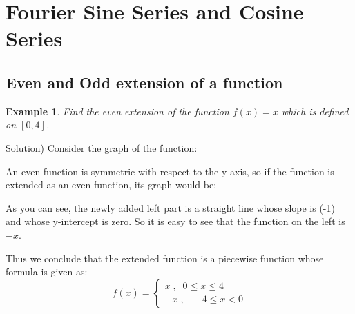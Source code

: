 \documentclass[12pt]{report}
\newtheorem{ex}{Example}[section]
\begin{document}
\section{Fourier Sine Series and Cosine Series}

\subsection*{Even and Odd extension of a function }

\begin{ex} Find the even extension of the function $f(x)= x$ which is defined on $[0,4]$.
	\end{ex}
Solution)
Consider the graph of the function:
\begin{center}  \end{center}

An even function is symmetric with respect to the y-axis, so if the function is extended as an even function, its graph would be:
\begin{center}  \end{center}

As you can see, the newly added left part is a straight line whose slope is (-1) and whose y-intercept is zero. So it is easy to see that the function on the left is $-x$.

Thus we conclude that the extended function is a piecewise function whose formula is given as:
$$f(x) = \begin{cases} x \; , \; \; 0\leq x\leq 4 \\ -x  \; , \; \; -4 \leq x < 0 \end{cases} $$
\end{document}

